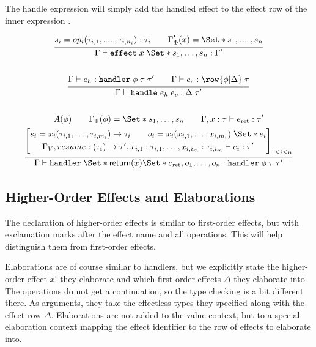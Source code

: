 The handle expression will simply add the handled effect to the effect row of the inner expression .

\begin{gather*}
    \infer{
        \Gamma \vdash \kw{effect}\;x\;\S{s_1, \dots, s_n}: \Gamma'
    }{
        s_i = op_i(\tau_{i,1},\dots, \tau_{i,n_i}): \tau_i
        \qquad
        \Gamma'_\Phi(x) = \S{s_1, \dots, s_n}
    }
    \\\\
    \infer{
        \Gamma \vdash \handle\;e_h\;e_c : \Delta\;\tau'
    }{
        \Gamma \vdash e_h : \handler\;\phi\;\tau\;\tau'
        \qquad
        \Gamma \vdash e_c : \row{\phi | \Delta}\;\tau
    }
    \\\\
    \infer{
        \Gamma \vdash \handler\;\S{ \return(x) \S{ e_{\text{ret}} }, o_1, \dots, o_n }
        : \handler\;\phi\;\tau\;\tau'
    }{
        A(\phi)
        \qquad
        \Gamma_\Phi(\phi) = \S{ s_1, \dots, s_n }
        \qquad
        \Gamma, x: \tau \vdash e_{\text{ret}} : \tau' 
        \\
        \left[
            \begin{gathered}
                s_i = x_i(\tau_{i,1}, \dots, \tau_{i,m_i}) \to \tau_i
                \qquad
                o_i = x_i(x_{i,1}, \dots, x_{i,m_i})\;\S{ e_i }
                \\
                \Gamma_V, resume : (\tau_i) \to \tau', x_{i,1}: \tau_{i,1}, \dots, x_{i,i_m}: \tau_{i,i_m} 
                \vdash e_i: \tau'
            \end{gathered}
        \right]_{1\leq i\leq n}
    }
\end{gather*}

\subsection{Higher-Order Effects and Elaborations}

The declaration of higher-order effects is similar to first-order effects, but with exclamation marks after the effect name and all operations. This will help distinguish them from first-order effects.

Elaborations are of course similar to handlers, but we explicitly state the higher-order effect $x!$ they elaborate and which first-order effects $\Delta$ they elaborate into. The operations do not get a continuation, so the type checking is a bit different there. As arguments, they take the effectless types they specified along with the effect row $\Delta$. Elaborations are not added to the value context, but to a special elaboration context mapping the effect identifier to the row of effects to elaborate into.
\\

